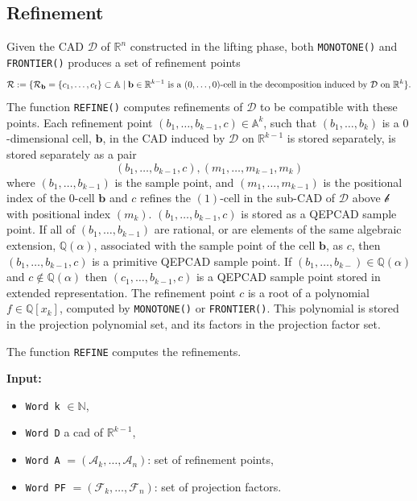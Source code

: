 \documentclass[
]{book}
\providecommand{\tightlist}{%
  \setlength{\itemsep}{0pt}\setlength{\parskip}{0pt}}
\theoremstyle{definition}
\theoremstyle{definition}
\theoremstyle{definition}
\theoremstyle{definition}
\theoremstyle{remark}
\begin{document}
\hypertarget{sec:implementation-refinement}{%
\subsection{Refinement}\label{sec:implementation-refinement}}

Given the CAD \(\mathcal{D}\) of \(\mathbb{R}^n\) constructed in the lifting phase, both \texttt{MONOTONE()} and \texttt{FRONTIER()} produces a set of refinement points
\[
{\cal R} := \{ {\cal R}_{\mathbf{b}} = \{ c_1,\ldots,c_t \} \subset \mathbb{A}\mid \mathbf{b} \in \mathbb{R}^{k-1} \text{ is a } (0,\ldots,0) \text{-cell in the decomposition induced by } {\cal D} \text{ on } \mathbb{R}^k \}.
\]
The function \texttt{REFINE()} computes refinements of \(\mathcal{D}\) to be compatible with these points. Each refinement point \((b_1,\ldots,b_{k-1},c) \in \mathbb{A}^k\), such that \((b_1,\ldots,b_k)\) is a \(0\)-dimensional cell, \(\mathbf{b}\), in the CAD induced by \(\mathcal{D}\) on \(\mathbb{R}^{k-1}\) is stored separately, is stored separately as a pair
\[
(b_1,\ldots,b_{k-1},c), (m_1,\ldots,m_{k-1},m_k)
\]
where \((b_1,\ldots,b_{k-1})\) is the sample point, and \((m_1,\ldots,m_{k-1})\) is the positional index of the \(0\)-cell \(\mathbf{b}\) and \(c\) refines the \((1)\)-cell in the sub-CAD of \(\mathcal{D}\) above \(\mathcal{b}\) with positional index \((m_k)\).
\((b_1,\ldots,b_{k-1},c)\) is stored as a QEPCAD sample point.
If all of \((b_1,\ldots,b_{k-1})\) are rational, or are elements of the same algebraic extension, \(\mathbb{Q}(\alpha)\), associated with the sample point of the cell \(\mathbf{b}\), as \(c\), then \((b_1,\ldots,b_{k-1},c)\) is a primitive QEPCAD sample point. If \((b_1,\ldots,b_{k-}) \in \mathbb{Q}(\alpha)\) and \(c \not \in \mathbb{Q}(\alpha)\) then \((c_1,\ldots,b_{k-1},c)\) is a QEPCAD sample point stored in extended representation.
The refinement point \(c\) is a root of a polynomial \(f \in \mathbb{Q}[x_k]\), computed by \texttt{MONOTONE()} or \texttt{FRONTIER()}. This polynomial is stored in the projection polynomial set, and its factors in the projection factor set.

The function \texttt{REFINE} computes the refinements.

\textbf{Input:}

\begin{itemize}
\tightlist
\item
  \texttt{Word\ k} \(\in \mathbb{N}\),
\item
  \texttt{Word\ D} a cad of \(\mathbb{R}^{k-1}\),
\item
  \texttt{Word\ A} \(= (\mathcal{A}_k, \ldots, \mathcal{A}_n)\): set of refinement points,
\item
  \texttt{Word\ PF} \(= (\mathcal{F}_k, \ldots, \mathcal{F}_n)\): set of projection factors.
\end{itemize}
\end{document}
